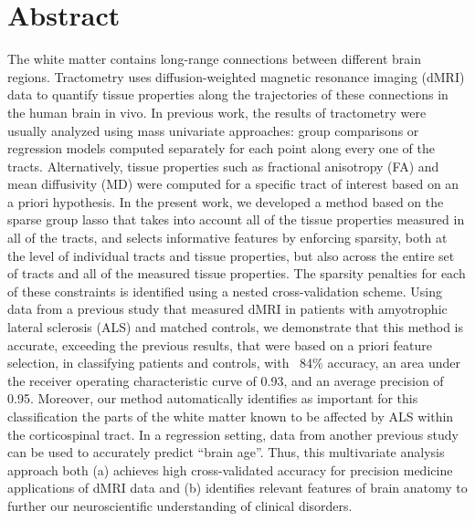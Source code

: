 \section*{Abstract}


The white matter contains long-range connections between different brain regions. Tractometry uses diffusion-weighted magnetic resonance imaging (dMRI) data to quantify tissue properties along the trajectories of these connections in the human brain in vivo\cite{yeatman2012tract}. In previous work, the results of tractometry were usually analyzed using mass univariate approaches: group comparisons or regression models computed separately for each point along every one of the tracts.  Alternatively, tissue properties such as fractional anisotropy (FA) and mean diffusivity (MD) were computed for a specific tract of interest based on an a priori hypothesis. In the present work, we developed a method based on the sparse group lasso\cite{simon2013sparse} that takes into account all of the tissue properties measured in all of the tracts, and selects informative features by enforcing sparsity, both at the level of individual tracts and tissue properties, but also across the entire set of tracts and all of the measured tissue properties. The sparsity penalties for each of these constraints is identified using a nested cross-validation scheme. Using data from a previous study that measured dMRI in patients with amyotrophic lateral sclerosis (ALS) and matched controls\cite{sarica2017corticospinal}, we demonstrate that this method is accurate, exceeding the previous results, that were based on a priori feature selection, in classifying patients and controls, with ~84\% accuracy, an area under the receiver operating characteristic curve of 0.93, and an average precision of 0.95. Moreover, our method automatically identifies as important for this classification the parts of the white matter known to be affected by ALS within the corticospinal tract. In a regression setting, data from another previous study\cite{yeatman2014lifespan} can be used to accurately predict ``brain age''. Thus, this multivariate analysis approach both (a) achieves high cross-validated accuracy for precision medicine applications of dMRI data and (b) identifies relevant features of brain anatomy to further our neuroscientific understanding of clinical disorders.
